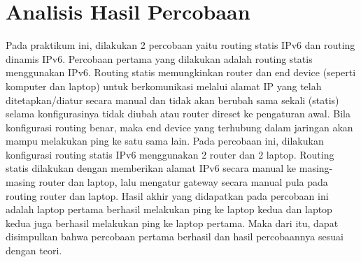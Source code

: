 \section{Analisis Hasil Percobaan}
\indent Pada praktikum ini, dilakukan 2 percobaan yaitu routing statis IPv6 dan routing dinamis IPv6. Percobaan pertama yang dilakukan adalah routing statis menggunakan IPv6. Routing statis memungkinkan router dan end device (seperti komputer dan laptop) untuk berkomunikasi melalui alamat IP yang telah ditetapkan/diatur secara manual dan tidak akan berubah sama sekali (statis) selama konfigurasinya tidak diubah atau router direset ke pengaturan awal. Bila konfigurasi routing benar, maka end device yang terhubung dalam jaringan akan mampu melakukan ping ke satu sama lain. Pada percobaan ini, dilakukan konfigurasi routing statis IPv6 menggunakan 2 router dan 2 laptop. Routing statis dilakukan dengan memberikan alamat IPv6 secara manual ke masing-masing router dan laptop, lalu mengatur gateway secara manual pula pada routing router dan laptop. Hasil akhir yang didapatkan pada percobaan ini adalah laptop pertama berhasil melakukan ping ke laptop kedua dan laptop kedua juga berhasil melakukan ping ke laptop pertama. Maka dari itu, dapat disimpulkan bahwa percobaan pertama berhasil dan hasil percobaannya sesuai dengan teori.
